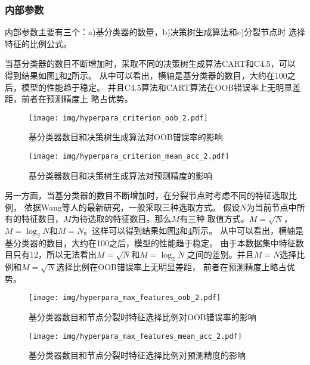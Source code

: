 \documentclass[main.tex]{subfiles}
\begin{document}
\subsubsection{内部参数}
内部参数主要有三个：a)基分类器的数量，b)决策树生成算法和c)分裂节点时
选择特征的比例公式。

当基分类器的数目不断增加时，采取不同的决策树生成算法CART和C4.5，可以
得到结果如图\ref{hyper_ab_oob}和\ref{hyper_ab_acc}所示。
从中可以看出，横轴是基分类器的数目，大约在100之后，模型的性能趋于稳定。
并且C4.5算法和CART算法在OOB错误率上无明显差距，前者在预测精度上
略占优势。

\begin{figure}[htbp!]
    \centering \texttt{[image: img/hyperpara\_criterion\_oob\_2.pdf]} 
    \caption{基分类器数目和决策树生成算法对OOB错误率的影响}
    \label{hyper_ab_oob}
\end{figure}


\begin{figure}[htbp!]
    \centering \texttt{[image: img/hyperpara\_criterion\_mean\_acc\_2.pdf]} 
    \caption{基分类器数目和决策树生成算法对预测精度的影响}
    \label{hyper_ab_acc}
\end{figure}

另一方面，当基分类器的数目不断增加时，在分裂节点时考虑不同的特征选取比例，
依据Wang等人的最新研究\cite{wang2020forest}，一般采取三种选取方式。
假设$N$为当前节点中所有的特征数目，$M$为待选取的特征数目。那么$M$有三种
取值方式。$M=\sqrt{N}$，$M=\log _{2}{N}$和$M=N$。这样可以得到结果如图\ref{hyper_ac_oob}和\ref{hyper_ac_acc}所示。
从中可以看出，横轴是基分类器的数目，大约在100之后，模型的性能趋于稳定。
由于本数据集中特征数目只有12，所以无法看出$M=\sqrt{N}$和$M=\log _{2}{N}$
之间的差别。并且$M=N$选择比例和$M=\sqrt{N}$选择比例在OOB错误率上无明显差距，
前者在预测精度上略占优势。

\begin{figure}[htbp!]
    \centering \texttt{[image: img/hyperpara\_max\_features\_oob\_2.pdf]} 
    \caption{基分类器数目和节点分裂时特征选择比例对OOB错误率的影响}
    \label{hyper_ac_oob}
\end{figure}


\begin{figure}[htbp!]
    \centering \texttt{[image: img/hyperpara\_max\_features\_mean\_acc\_2.pdf]} 
    \caption{基分类器数目和节点分裂时特征选择比例对预测精度的影响}
    \label{hyper_ac_acc}
\end{figure}
\end{document}
